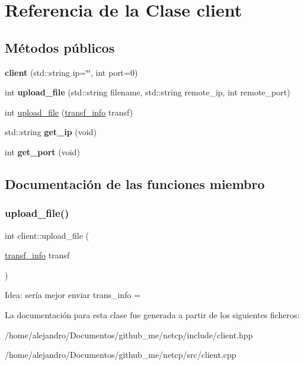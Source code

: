 \hypertarget{classclient}{}\section{Referencia de la Clase client}
\label{classclient}
\subsection*{Métodos públicos}
\begin{DoxyCompactItemize}
\item 
\mbox{\label{classclient_ad6d60f584e78a52b5fefcb5c4a50bd76}} 
{\bfseries client} (std\+::string ip=\char`\"{}\char`\"{}, int port=0)
\item 
\mbox{\label{classclient_a368b7cb1a96e6bcf4f96fba54aa431e9}} 
int {\bfseries upload\+\_\+file} (std\+::string filename, std\+::string remote\+\_\+ip, int remote\+\_\+port)
\item 
int \hyperlink{classclient_ad95e87b6c247313d2ebc2976a3d25117}{upload\+\_\+file} (\hyperlink{structtransf__info}{transf\+\_\+info} transf)
\item 
\mbox{\label{classclient_a050303ea3d6bd349a78e29b525d59ec9}} 
std\+::string {\bfseries get\+\_\+ip} (void)
\item 
\mbox{\label{classclient_ad06b72ab9ff49c86ecbc1696364cf491}} 
int {\bfseries get\+\_\+port} (void)
\end{DoxyCompactItemize}


\subsection{Documentación de las funciones miembro}
\mbox{\label{classclient_ad95e87b6c247313d2ebc2976a3d25117}} 
\subsubsection{\texorpdfstring{upload\+\_\+file()}{upload\_file()}}
{\footnotesize\ttfamily int client\+::upload\+\_\+file (\begin{DoxyParamCaption}\item[{\hyperlink{structtransf__info}{transf\+\_\+info}}]{transf }\end{DoxyParamCaption})}

Idea\+: sería mejor enviar trans\+\_\+info =

La documentación para esta clase fue generada a partir de los siguientes ficheros\+:\begin{DoxyCompactItemize}
\item 
/home/alejandro/\+Documentos/github\+\_\+me/netcp/include/client.\+hpp\item 
/home/alejandro/\+Documentos/github\+\_\+me/netcp/src/client.\+cpp\end{DoxyCompactItemize}
